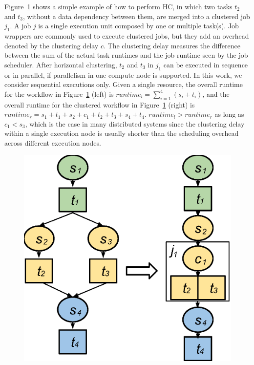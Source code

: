 \documentclass{IOS-Book-Article}
\begin{document}
Figure~\ref{fig:model_hc} shows a simple example of how to perform HC, in which two tasks $t_2$ and $t_3$, without a data dependency between them, are merged into a clustered job $j_1$. A job $j$ is a single execution unit composed by one or multiple task(s). Job wrappers are commonly used to execute clustered jobs, but they add an overhead denoted by the clustering delay $c$. The clustering delay measures the difference between the sum of the actual task runtimes and the job runtime seen by the job scheduler. 
After horizontal clustering, $t_2$ and $t_3$ in $j_1$ can be executed in sequence or in parallel, if parallelism in one compute node is supported. In this work, we consider sequential executions only. Given a single resource, the overall runtime for the workflow in Figure~\ref{fig:model_hc} (left) is $runtime_l= \sum_{i=1}^{4}(s_i+t_i)$, and the overall runtime for the clustered workflow in Figure~\ref{fig:model_hc} (right) is $runtime_r=s_1+t_1+s_2+c_1+t_2+t_3+s_4+t_4$.  $runtime_l > runtime_r$ as long as $c_1 < s_3$, which is the case in many distributed systems since the clustering delay within a single execution node is usually shorter than the scheduling overhead across different execution nodes. 

\begin{figure}[!htb]
\centering
 \includegraphics[width=0.55\linewidth]{figure3.eps}
  \label{fig:model_hc}
\end{figure}
\end{document}
